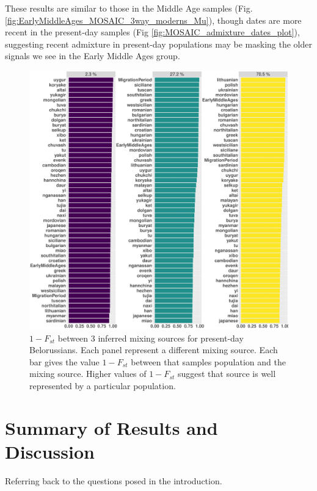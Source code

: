 These results are similar to those in the Middle Age samples (Fig. \ref{fig:EarlyMiddleAges_MOSAIC_3way_moderns_Mu}), though dates are more recent in the present-day samples (Fig \ref{fig:MOSAIC_admixture_dates_plot}), suggesting recent admixture in present-day populations may be masking the older signals we see in the Early Middle Ages group.

\begin{figure}[htp]
    \centering
    \includegraphics[width=1.0\textwidth]{../images/chapter5/Fst_plot_HB:belorussian.pdf}
    \caption{$1 - F_{st}$ between 3 inferred mixing sources for present-day Belorussians. Each panel represent a different mixing source. Each bar gives the value $1-F_{st}$ between that samples population and the mixing source. Higher values of $1-F_{st}$ suggest that source is well represented by a particular population. }
    \label{fig:Fst_plot_HB:lithuanian}
\end{figure} 

\section{Summary of Results and Discussion}

Referring back to the questions posed in the introduction.

